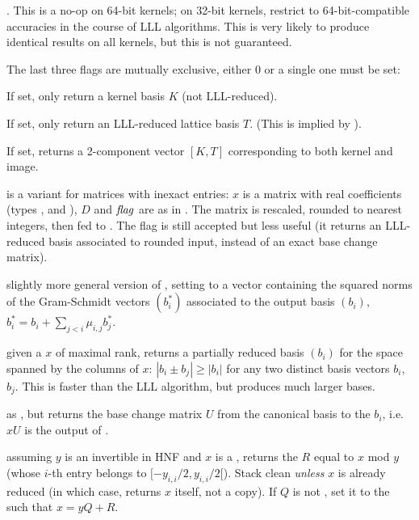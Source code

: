 \item  {}. This is a no-op on 64-bit kernels; on 32-bit
kernels, restrict to 64-bit-compatible accuracies in the course of LLL
algorithms. This is very likely to produce identical results on all
kernels, but this is not guaranteed.

The last three flags are mutually exclusive, either 0 or a single one must be
set:

\item  {} If set, only return a kernel basis $K$ (not LLL-reduced).

\item  {} If set, only return an LLL-reduced lattice basis $T$.
(This is implied by ).

\item  {} If set, returns a 2-component vector $[K, T]$
corresponding to both kernel and image.


 is a variant for matrices
with inexact entries: $x$ is a matrix with real coefficients (types
,  and ), $D$ and $\hbox{\it f\kern0pt lag\/}$ are as in .
The matrix is rescaled, rounded to nearest integers, then fed to
. The flag  is still accepted but less useful
(it returns an LLL-reduced basis associated to rounded input, instead of an
exact base change matrix).

 slightly more
general version of , setting  to a vector containing
the squared norms of the Gram-Schmidt vectors $(b_i^*)$ associated to the
output basis $(b_i)$, $b_i^* = b_i + \sum_{j < i} \mu_{i,j} b_j^*$.


 given a  $x$ of maximal rank,
returns a partially reduced basis $(b_i)$ for the space spanned by the
columns of $x$: $|b_i \pm b_j| \geq |b_i|$ for any two distinct basis vectors
$b_i$, $b_j$. This is faster than the LLL algorithm, but produces much larger
bases.

 as , but returns
the base change matrix $U$ from the canonical basis to the $b_i$, i.e. $x U$
is the output of .


 assuming $y$ is an
invertible  in HNF and $x$ is a , returns the  $R$
equal to $x$ mod $y$ (whose $i$-th entry belongs to $[-y_{i,i}/2, y_{i,i}/2[$).
Stack clean \emph{unless} $x$ is already reduced (in which case, returns $x$
itself, not a copy). If $Q$ is not , set it to the  such that
$x = yQ + R$.

